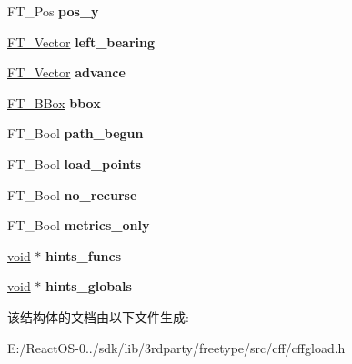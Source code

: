\begin{DoxyCompactItemize}
F\+T\+\_\+\+Pos {\bfseries pos\+\_\+y}
\item 
\mbox{\label{struct_c_f_f___builder___a1bee78d88325239036b57761fdd0423c}} 
\hyperlink{struct_f_t___vector__}{F\+T\+\_\+\+Vector} {\bfseries left\+\_\+bearing}
\item 
\mbox{\label{struct_c_f_f___builder___a943906425298bbbdc85e7a6d626224b5}} 
\hyperlink{struct_f_t___vector__}{F\+T\+\_\+\+Vector} {\bfseries advance}
\item 
\mbox{\label{struct_c_f_f___builder___a678703f4909900aa2d4c2f6a6e4e2553}} 
\hyperlink{struct_f_t___b_box__}{F\+T\+\_\+\+B\+Box} {\bfseries bbox}
\item 
\mbox{\label{struct_c_f_f___builder___ac8770a979f76c1dc11575dfdf40f1f88}} 
F\+T\+\_\+\+Bool {\bfseries path\+\_\+begun}
\item 
\mbox{\label{struct_c_f_f___builder___abcce85e0ee7ffe37e1cbd3d6cea110c2}} 
F\+T\+\_\+\+Bool {\bfseries load\+\_\+points}
\item 
\mbox{\label{struct_c_f_f___builder___af2637a092e49c57e69a414a79f777743}} 
F\+T\+\_\+\+Bool {\bfseries no\+\_\+recurse}
\item 
\mbox{\label{struct_c_f_f___builder___a649801f2012fc5927cc2647fbb71609d}} 
F\+T\+\_\+\+Bool {\bfseries metrics\+\_\+only}
\item 
\mbox{\label{struct_c_f_f___builder___a7eb0d9144e82e76d6fe4fbd03b678c69}} 
\hyperlink{interfacevoid}{void} $\ast$ {\bfseries hints\+\_\+funcs}
\item 
\mbox{\label{struct_c_f_f___builder___a65eb4c3939cd9dc8a176d0f42db20137}} 
\hyperlink{interfacevoid}{void} $\ast$ {\bfseries hints\+\_\+globals}
\end{DoxyCompactItemize}


该结构体的文档由以下文件生成\+:\begin{DoxyCompactItemize}
\item 
E\+:/\+React\+O\+S-\/0../sdk/lib/3rdparty/freetype/src/cff/cffgload.\+h\end{DoxyCompactItemize}

